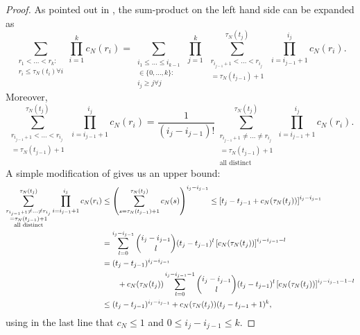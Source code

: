 \documentclass{article}
\newcommand{\1}[1]{\mathbbm{1}_{#1}}
\begin{document}
\begin{proof}
As pointed out in \citet[p.~460]{mohle1999}, the sum-product on the left hand side can be expanded as
\begin{equation}
\sum_{\substack{r_1<\dots<r_k :\\ r_i\leq \tau_N(t_i) \forall i}} \prod_{i=1}^k c_N(r_i)
= \sum_{\substack{i_1\leq \dots\leq i_{k-1}\\ \in \{0,\dots,k\} :\\ i_j \geq j \forall j}} \, \prod_{j=1}^k \,
\sum_{\substack{ r_{i_{j-1}+1} < \dots < r_{i_j} \\ = \tau_N(t_{j-1})+1}}^{\tau_N(t_j)}  \,\prod_{i=i_{j-1}+1}^{i_j} c_N(r_i) .
\end{equation}
Moreover,
\begin{equation}
\sum_{\substack{ r_{i_{j-1}+1} < \dots < r_{i_j} \\ = \tau_N(t_{j-1})+1}}^{\tau_N(t_j)}  \,\prod_{i=i_{j-1}+1}^{i_j} c_N(r_i)
= \frac{1}{(i_j - i_{j-1})!} \sum_{\substack{ r_{i_{j-1}+1} \neq \dots \neq r_{i_j} \\ = \tau_N(t_{j-1})+1 \\ \text{all distinct}}}^{\tau_N(t_j)}
\prod_{i=i_{j-1}+1}^{i_j} c_N(r_i) .
\end{equation}
A simple modification of \citet[(9)]{koskela2018} gives us an upper bound:
\begin{align}
\sum_{\substack{ r_{i_{j-1}+1} \neq \dots \neq r_{i_j} \\ = \tau_N(t_{j-1})+1 \\ \text{all distinct}}}^{\tau_N(t_j)}
\prod_{i=i_{j-1}+1}^{i_j} c_N(r_i)
&\leq \left( \sum_{s=\tau_N(t_{j-1})+1}^{\tau_N(t_j)} c_N(s) \right)^{i_j - i_{j-1}}
\leq \left[ t_j - t_{j-1} + c_N(\tau_N(t_j)) \right]^{i_j - i_{j-1}} \notag\\
&= \sum_{l=0}^{i_j - i_{j-1}} \binom{i_j - i_{j-1}}{l} (t_j - t_{j-1})^l \left[ c_N(\tau_N(t_j)) \right]^{i_j - i_{j-1}-l} \notag\\
&= (t_j - t_{j-1})^{i_j - i_{j-1}} \notag\\
&\qquad+ c_N(\tau_N(t_j)) \sum_{l=0}^{i_j - i_{j-1} -1} \binom{i_j - i_{j-1}}{l} (t_j - t_{j-1})^l \left[ c_N(\tau_N(t_j)) \right]^{i_j - i_{j-1}-1-l} \notag\\
&\leq (t_j - t_{j-1})^{i_j - i_{j-1}} 
+ c_N(\tau_N(t_j)) ( t_j - t_{j-1} +1 )^k ,
\end{align}
using in the last line that $c_N \leq 1$ and $0 \leq i_j - i_{j-1} \leq k$.

\end{proof}
\end{document}
